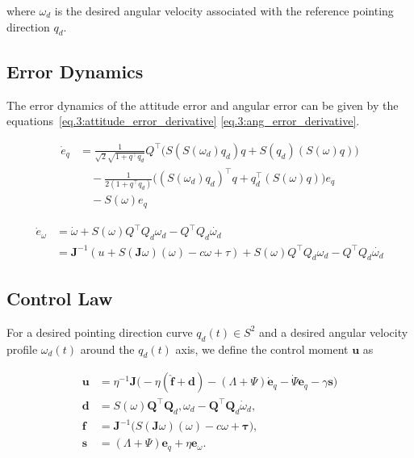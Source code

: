 where $\omega_d$ is the desired angular velocity associated with the reference pointing direction $q_d$.

\subsection{Error Dynamics}
The error dynamics of the attitude error and angular error can be given by the equations~\ref{eq.3:attitude_error_derivative} \ref{eq.3:ang_error_derivative}.

\begin{equation}
    \begin{aligned}
        \dot{e}_q
        &= \frac{1}{\sqrt{2}\sqrt{1 + q^\top q_d}}
        Q^\top \bigl( S(S(\omega_d) q_d) q + S(q_d)(S(\omega) q) \bigr) \\
        &\quad - \frac{1}{2(1 + q^\top q_d)}
        \bigl( (S(\omega_d) q_d)^\top q + q_d^\top (S(\omega) q) \bigr) e_q \\
        &\quad - S(\omega) e_q
    \end{aligned}
    \label{eq.3:attitude_error_derivative}
\end{equation}


\begin{equation}
    \begin{aligned}
        \dot{e}_\omega
        &= \dot{\omega}+S(\omega)Q^\top Q_d \omega_d-Q^\top Q_d \dot{\omega_d}\\
        &= \mathbf{J}^{-1}(u+S(\mathbf{J}\omega)(\omega)-c\omega+\tau)+S(\omega)Q^\top Q_d \omega_d-Q^\top Q_d \dot{\omega_d} 
    \end{aligned}
    \label{eq.3:ang_error_derivative}
\end{equation}

\subsection{Control Law}

For a desired pointing direction curve $q_d(t) \in S^2$ and a desired angular velocity profile
$\omega_d(t)$ around the $q_d(t)$ axis, we define the control moment $\mathbf{u}$ as

\begin{equation}
    \begin{aligned}
        \mathbf{u} &= \eta^{-1}\mathbf{J}
        \Big(
        -\eta(\hat{\mathbf{f}} + \mathbf{d})
        - (\Lambda + \Psi) \dot{\mathbf{e}}_q
        - \dot{\Psi} \mathbf{e}_q
        - \gamma \mathbf{s}
        \Big)\\
        \mathbf{d} &= S(\omega)\mathbf{Q}^\top \mathbf{Q}_d,\omega_d
        - \mathbf{Q}^\top \mathbf{Q}_d \dot{\omega}_d,\\
        \mathbf{f} &= \mathbf{J}^{-1}
        \Big(
        S(\mathbf{J}\omega) (\omega)
        - c\omega
        + \boldsymbol{\tau}
        \Big),\\
        \mathbf{s} &= (\Lambda + \Psi)\mathbf{e}_q + \eta \mathbf{e}_\omega.
    \end{aligned}
    \label{eq.3:actuation_lyapunov}
\end{equation}

